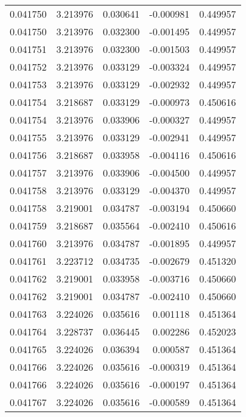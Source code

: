 \begin{tabular}{lrrrr}
0.041750    &  3.213976 &  0.030641 & -0.000981 &             0.449957 \\
0.041750    &  3.213976 &  0.032300 & -0.001495 &             0.449957 \\
0.041751    &  3.213976 &  0.032300 & -0.001503 &             0.449957 \\
0.041752    &  3.213976 &  0.033129 & -0.003324 &             0.449957 \\
0.041753    &  3.213976 &  0.033129 & -0.002932 &             0.449957 \\
0.041754    &  3.218687 &  0.033129 & -0.000973 &             0.450616 \\
0.041754    &  3.213976 &  0.033906 & -0.000327 &             0.449957 \\
0.041755    &  3.213976 &  0.033129 & -0.002941 &             0.449957 \\
0.041756    &  3.218687 &  0.033958 & -0.004116 &             0.450616 \\
0.041757    &  3.213976 &  0.033906 & -0.004500 &             0.449957 \\
0.041758    &  3.213976 &  0.033129 & -0.004370 &             0.449957 \\
0.041758    &  3.219001 &  0.034787 & -0.003194 &             0.450660 \\
0.041759    &  3.218687 &  0.035564 & -0.002410 &             0.450616 \\
0.041760    &  3.213976 &  0.034787 & -0.001895 &             0.449957 \\
0.041761    &  3.223712 &  0.034735 & -0.002679 &             0.451320 \\
0.041762    &  3.219001 &  0.033958 & -0.003716 &             0.450660 \\
0.041762    &  3.219001 &  0.034787 & -0.002410 &             0.450660 \\
0.041763    &  3.224026 &  0.035616 &  0.001118 &             0.451364 \\
0.041764    &  3.228737 &  0.036445 &  0.002286 &             0.452023 \\
0.041765    &  3.224026 &  0.036394 &  0.000587 &             0.451364 \\
0.041766    &  3.224026 &  0.035616 & -0.000319 &             0.451364 \\
0.041766    &  3.224026 &  0.035616 & -0.000197 &             0.451364 \\
0.041767    &  3.224026 &  0.035616 & -0.000589 &             0.451364 \\

\end{tabular}
